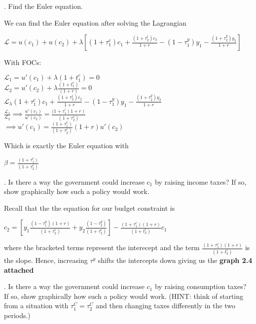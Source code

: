 \documentclass[11pt]{SelfArxOneColBMN}
\begin{document}
. Find the Euler equation.\\
\begin{solution}
  We can find the Euler equation after solving the Lagrangian
  \begin{center}
    $\mathcal{L} = u(c_1) + u(c_2) + \lambda[(1 + \tau_1^c)c_1 + \frac{(1 + \tau_2^t)c_2}{1 + r} - (1 - \tau_1^y)y_1 - \frac{(1 + \tau_2^y)y_2}{1 + r}]$
  \end{center}
  With FOCs:
  \begin{center}
    $\mathcal{L}_1 = u'(c_1) + \lambda(1 + t_1^c) = 0$\\
    $\mathcal{L}_2 = u'(c_2) + \lambda\frac{(1 + t_1^c)}{(1 + r)} = 0$\\
    $\mathcal{L}_\lambda (1 + \tau_1^c)c_1 + \frac{(1 + \tau_2^t)c_2}{1 + r} - (1 - \tau_1^y)y_1 - \frac{(1 + \tau_2^y)y_2}{1 + r}$\\
    $\frac{\mathcal{L}_1}{\mathcal{L}_2} \implies \frac{u'(c_1)}{u'(c_2)} = \frac{(1 + \tau_1^)(1 + r)}{(1 + \tau_2^c)}$\\
    $\implies u'(c_1) = \frac{(1 + \tau_1^c)}{(1 + \tau_2^c)}(1 + r)u'(c_2)$
  \end{center}
  Which is exactly the Euler equation with
  \begin{center}
    $\beta = \frac{(1 + \tau_1^c)}{(1 + \tau_2^c)}$
  \end{center}
\end{solution}
. Is there a way the government could increase $c_1$ by raising income taxes? If so, show graphically how such a policy would work.\\
\begin{solution}
  Recall that the the equation for our budget constraint is
  \begin{center}
    $c_2 = [y_1\frac{(1 - \tau_1^y)(1 + r)}{(1 + \tau_2^c)} + y_2\frac{(1 - \tau_2^y)}{(1 + \tau_2^c)}] - \frac{(1 + \tau_1^c)(1 + r)}{(1 +t_2^c)}c_1$
  \end{center}
  where the bracketed terms represent the interecept and the term $\frac{(1 + \tau_1^c)(1 + r)}{(1 +t_2^c)}$ is the slope. Hence, increasing $\tau^y$ shifts the intercepts down giving us the \textbf{graph 2.4 attached}
\end{solution}
. Is there a way the government could increase $c_1$ by raising consumption taxes? If so, show graphically how such a policy would work. (HINT: think of starting from a situation with $\tau_1^C = \tau_2^C$ and then changing taxes differently in the two periods.)\\
\end{document}
